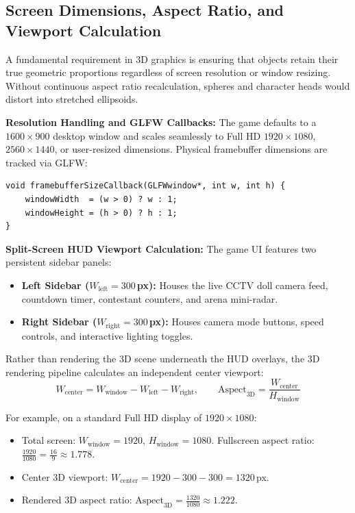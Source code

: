 \documentclass[11pt,a4paper]{article}
\begin{document}
\subsection{Screen Dimensions, Aspect Ratio, and Viewport Calculation}
A fundamental requirement in 3D graphics is ensuring that objects retain their true geometric proportions
regardless of screen resolution or window resizing. Without continuous aspect ratio recalculation, spheres
and character heads would distort into stretched ellipsoids.

\textbf{Resolution Handling and GLFW Callbacks:}
The game defaults to a $1600 \times 900$ desktop window and scales seamlessly to Full HD $1920 \times 1080$,
$2560 \times 1440$, or user-resized dimensions. Physical framebuffer dimensions are tracked via GLFW:
\begin{lstlisting}
void framebufferSizeCallback(GLFWwindow*, int w, int h) {
    windowWidth  = (w > 0) ? w : 1;
    windowHeight = (h > 0) ? h : 1;
}
\end{lstlisting}

\textbf{Split-Screen HUD Viewport Calculation:}
The game UI features two persistent sidebar panels:
\begin{itemize}
  \item \textbf{Left Sidebar ($W_{\text{left}} = 300$\,px):} Houses the live CCTV doll camera feed, countdown timer, contestant counters, and arena mini-radar.
  \item \textbf{Right Sidebar ($W_{\text{right}} = 300$\,px):} Houses camera mode buttons, speed controls, and interactive lighting toggles.
\end{itemize}

Rather than rendering the 3D scene underneath the HUD overlays, the 3D rendering pipeline calculates
an independent center viewport:
\begin{equation}
W_{\text{center}} = W_{\text{window}} - W_{\text{left}} - W_{\text{right}}, \qquad
\text{Aspect}_{\text{3D}} = \frac{W_{\text{center}}}{H_{\text{window}}}
\end{equation}

For example, on a standard Full HD display of $1920 \times 1080$:
\begin{itemize}
  \item Total screen: $W_{\text{window}} = 1920$, $H_{\text{window}} = 1080$. Fullscreen aspect ratio: $\frac{1920}{1080} = \frac{16}{9} \approx 1.778$.
  \item Center 3D viewport: $W_{\text{center}} = 1920 - 300 - 300 = 1320$\,px.
  \item Rendered 3D aspect ratio: $\text{Aspect}_{\text{3D}} = \frac{1320}{1080} \approx 1.222$.
\end{itemize}
\end{document}
